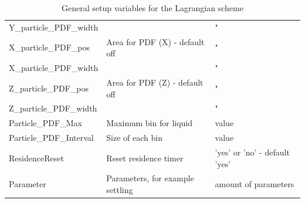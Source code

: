 \documentclass[12pt]{article}
\begin{document}
\begin{table}
{\begin{tabular}{|p{4cm}|p{6cm}|p{5cm}|}
    Y\_particle\_PDF\_width              & ~                                                                 & "                                                              \\ %
    X\_particle\_PDF\_pos                & Area for PDF (X) - default off                                    & "                                                              \\ %
    X\_particle\_PDF\_width              & ~                                                                 & "                                                              \\ %
    Z\_particle\_PDF\_pos                & Area for PDF (Z) - default off                                    & "                                                              \\ %
    Z\_particle\_PDF\_width              & ~                                                                 & "                                                              \\ %
    Particle\_PDF\_Max                   & Maximum bin for liquid                                         & value                                                          \\ %
    Particle\_PDF\_Interval              & Size of each bin                                               & value                                                          \\ \hline
    ResidenceReset                       & Reset residence timer                                             & 'yes' or 'no' - default 'yes'                                  \\ \hline
    Parameter                            & Parameters, for example settling                                  & amount of parameters                                           \\ \hline
    \end{tabular}} 
    \caption{General setup variables for the Lagrangian scheme}
    \label{tab:general}   
\end{table}
\end{document}
